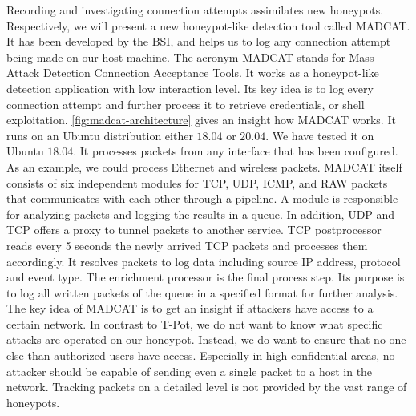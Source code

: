 Recording and investigating connection attempts assimilates new honeypots.
Respectively, we will present a new honeypot-like detection tool called MADCAT.
It has been developed by the BSI, and helps us to log any connection attempt being made on our host machine.
The acronym MADCAT stands for Mass Attack Detection Connection Acceptance Tools.
It works as a honeypot-like detection application with low interaction level.
Its key idea is to log every connection attempt and further process it to retrieve credentials, or shell exploitation.
\autoref{fig:madcat-architecture} gives an insight how MADCAT works.
It runs on an Ubuntu distribution either $18.04$ or $20.04$.
We have tested it on Ubuntu $18.04$.
It processes packets from any interface that has been configured.
As an example, we could process Ethernet and wireless packets.
MADCAT itself consists of six independent modules for TCP, UDP, ICMP, and RAW packets that communicates with each other through a pipeline.
A module is responsible for analyzing packets and logging the results in a queue.
In addition, UDP and TCP offers a proxy to tunnel packets to another service.
TCP postprocessor reads every 5 seconds the newly arrived TCP packets and processes them accordingly.
It resolves packets to log data including source IP address, protocol and event type.
The enrichment processor is the final process step.
Its purpose is to log all written packets of the queue in a specified format for further analysis.
The key idea of MADCAT is to get an insight if attackers have access to a certain network.
In contrast to T-Pot, we do not want to know what specific attacks are operated on our honeypot.
Instead, we do want to ensure that no one else than authorized users have access.
Especially in high confidential areas, no attacker should be capable of sending even a single packet to a host in the network.
Tracking packets on a detailed level is not provided by the vast range of honeypots.

